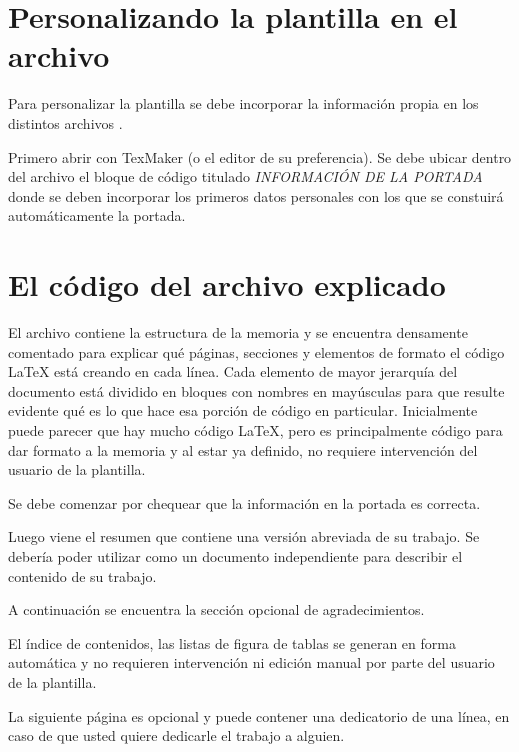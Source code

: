 \section{Personalizando la plantilla en el archivo }
\label{sec:FillingFile}

Para personalizar la plantilla se debe incorporar la información propia en los distintos archivos . 

Primero abrir  con TexMaker (o el editor de su preferencia). Se debe ubicar dentro del archivo el bloque de código titulado \emph{INFORMACIÓN DE LA PORTADA} donde se deben incorporar los primeros datos personales con los que se constuirá automáticamente la portada.



\section{El código del archivo  explicado}

El archivo  contiene la estructura de la memoria y se encuentra densamente comentado para explicar qué páginas, secciones y elementos de formato el código \LaTeX{} está creando en cada línea. Cada elemento de mayor jerarquía del documento está dividido en bloques con nombres en mayúsculas para que resulte evidente qué es lo que hace esa porción de código en particular. Inicialmente puede parecer que hay mucho código \LaTeX{}, pero es principalmente código para dar formato a la memoria y al estar ya definido, no requiere intervención del usuario de la plantilla.

Se debe comenzar por chequear que la información en la portada es correcta.

Luego viene el resumen que contiene una versión abreviada de su trabajo.  Se debería poder utilizar como un documento independiente para describir el contenido de su trabajo.

A continuación se encuentra la sección opcional de agradecimientos. 

El índice de contenidos, las listas de figura de tablas se generan en forma automática y no requieren intervención ni edición manual por parte del usuario de la plantilla. 

La siguiente página es opcional y puede contener una dedicatorio de una línea, en caso de que usted quiere dedicarle el trabajo a alguien.


